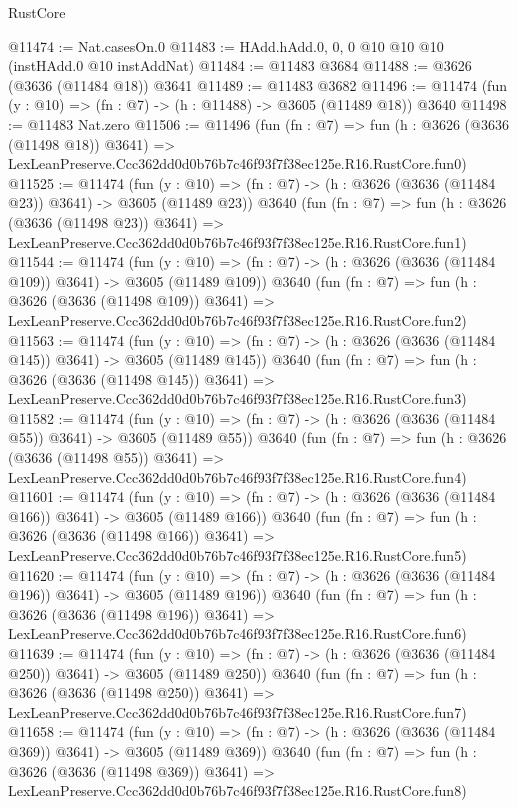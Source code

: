 \begin{lexlean}{RustCore}
\begin{coremodule}
@11474 := Nat.casesOn.{0}
@11483 := HAdd.hAdd.{0, 0, 0} @10 @10 @10 (instHAdd.{0} @10 instAddNat)
@11484 := @11483 @3684
@11488 := @3626 (@3636 (@11484 @18)) @3641
@11489 := @11483 @3682
@11496 := @11474 (fun (y : @10) => (fn : @7) -> (h : @11488) -> @3605 (@11489 @18)) @3640
@11498 := @11483 Nat.zero
@11506 := @11496
    (fun (fn : @7) =>
    fun (h : @3626 (@3636 (@11498 @18)) @3641) =>
    LexLeanPreserve.Ccc362dd0d0b76b7c46f93f7f38ec125e.R16.RustCore.fun0)
@11525 := @11474
    (fun (y : @10) => (fn : @7) -> (h : @3626 (@3636 (@11484 @23)) @3641) -> @3605 (@11489 @23))
    @3640
    (fun (fn : @7) =>
    fun (h : @3626 (@3636 (@11498 @23)) @3641) =>
    LexLeanPreserve.Ccc362dd0d0b76b7c46f93f7f38ec125e.R16.RustCore.fun1)
@11544 := @11474
    (fun (y : @10) => (fn : @7) -> (h : @3626 (@3636 (@11484 @109)) @3641) -> @3605 (@11489 @109))
    @3640
    (fun (fn : @7) =>
    fun (h : @3626 (@3636 (@11498 @109)) @3641) =>
    LexLeanPreserve.Ccc362dd0d0b76b7c46f93f7f38ec125e.R16.RustCore.fun2)
@11563 := @11474
    (fun (y : @10) => (fn : @7) -> (h : @3626 (@3636 (@11484 @145)) @3641) -> @3605 (@11489 @145))
    @3640
    (fun (fn : @7) =>
    fun (h : @3626 (@3636 (@11498 @145)) @3641) =>
    LexLeanPreserve.Ccc362dd0d0b76b7c46f93f7f38ec125e.R16.RustCore.fun3)
@11582 := @11474
    (fun (y : @10) => (fn : @7) -> (h : @3626 (@3636 (@11484 @55)) @3641) -> @3605 (@11489 @55))
    @3640
    (fun (fn : @7) =>
    fun (h : @3626 (@3636 (@11498 @55)) @3641) =>
    LexLeanPreserve.Ccc362dd0d0b76b7c46f93f7f38ec125e.R16.RustCore.fun4)
@11601 := @11474
    (fun (y : @10) => (fn : @7) -> (h : @3626 (@3636 (@11484 @166)) @3641) -> @3605 (@11489 @166))
    @3640
    (fun (fn : @7) =>
    fun (h : @3626 (@3636 (@11498 @166)) @3641) =>
    LexLeanPreserve.Ccc362dd0d0b76b7c46f93f7f38ec125e.R16.RustCore.fun5)
@11620 := @11474
    (fun (y : @10) => (fn : @7) -> (h : @3626 (@3636 (@11484 @196)) @3641) -> @3605 (@11489 @196))
    @3640
    (fun (fn : @7) =>
    fun (h : @3626 (@3636 (@11498 @196)) @3641) =>
    LexLeanPreserve.Ccc362dd0d0b76b7c46f93f7f38ec125e.R16.RustCore.fun6)
@11639 := @11474
    (fun (y : @10) => (fn : @7) -> (h : @3626 (@3636 (@11484 @250)) @3641) -> @3605 (@11489 @250))
    @3640
    (fun (fn : @7) =>
    fun (h : @3626 (@3636 (@11498 @250)) @3641) =>
    LexLeanPreserve.Ccc362dd0d0b76b7c46f93f7f38ec125e.R16.RustCore.fun7)
@11658 := @11474
    (fun (y : @10) => (fn : @7) -> (h : @3626 (@3636 (@11484 @369)) @3641) -> @3605 (@11489 @369))
    @3640
    (fun (fn : @7) =>
    fun (h : @3626 (@3636 (@11498 @369)) @3641) =>
    LexLeanPreserve.Ccc362dd0d0b76b7c46f93f7f38ec125e.R16.RustCore.fun8)

\end{coremodule}
\end{lexlean}
